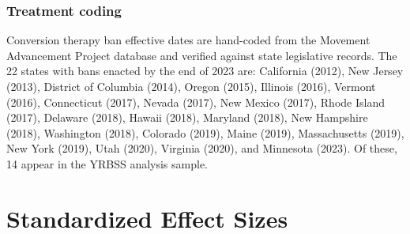 \documentclass[12pt]{article}
\begin{document}
\subsubsection*{Treatment coding} Conversion therapy ban effective dates are hand-coded from the Movement Advancement Project database and verified against state legislative records. The 22 states with bans enacted by the end of 2023 are: California (2012), New Jersey (2013), District of Columbia (2014), Oregon (2015), Illinois (2016), Vermont (2016), Connecticut (2017), Nevada (2017), New Mexico (2017), Rhode Island (2017), Delaware (2018), Hawaii (2018), Maryland (2018), New Hampshire (2018), Washington (2018), Colorado (2019), Maine (2019), Massachusetts (2019), New York (2019), Utah (2020), Virginia (2020), and Minnesota (2023). Of these, 14 appear in the YRBSS analysis sample.

\section{Standardized Effect Sizes}
\label{sec:sde}


\end{document}
